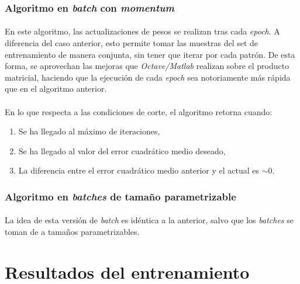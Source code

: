 \documentclass[12pt, twocolumn]{article}
\begin{document}
	
	\subsubsection{Algoritmo en \textit{batch} con \textit{momentum}}
	
	\paragraph{} En este algoritmo, las actualizaciones de pesos se realizan tras cada \textit{epoch}. A diferencia del caso anterior, esto permite tomar las muestras del set de entrenamiento de manera conjunta, sin tener que iterar por cada patrón. De esta forma, se aprovechan las mejoras que \textit{Octave/Matlab} realizan sobre el producto matricial, haciendo que la ejecución de cada \textit{epoch} sea notoriamente más rápida que en el algoritmo anterior. 
	
	\paragraph{} En lo que respecta a las condiciones de corte, el algoritmo retorna cuando:
	
	\begin{enumerate}
		\item Se ha llegado al máximo de iteraciones,
		\item Se ha llegado al valor del error cuadrático medio deseado,
		\item La diferencia entre el error cuadrático medio anterior y el actual es $\sim 0$.
	\end{enumerate}
	
	\subsubsection{Algoritmo en \textit{batches} de tamaño parametrizable}
	
	\paragraph{} La idea de esta versión de \textit{batch} es idéntica a la anterior, salvo que los \textit{batches} se toman de a tamaños parametrizables.
	
	\newpage
	
	\section{Resultados del entrenamiento}
	
\end{document}
